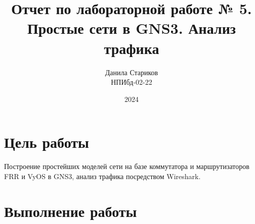 
\title{Отчет по лабораторной работе № 5. \\ Простые сети в GNS3. Анализ трафика}
\author{Данила Стариков \\ НПИбд-02-22}
\date{2024}



\maketitle
\newpage

\tableofcontents

\newpage
\section{Цель работы}
Построение простейших моделей сети на базе коммутатора и маршрутизаторов FRR и VyOS в GNS3, анализ трафика посредством Wireshark.

\newpage
\section{Выполнение работы}
